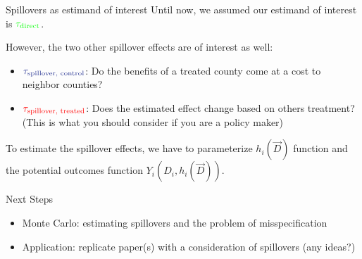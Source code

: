 \documentclass[aspectratio=43]{beamer}
\begin{document}
\begin{frame}{Spillovers as estimand of interest}
    Until now, we assumed our estimand of interest is $\textcolor{green}{\tau_{\text{direct}}}$.

    However, the two other spillover effects are of interest as well:
    \begin{itemize}
        \item $\textcolor{purple}{\tau_{\text{spillover, control}}}$: Do the benefits of a treated county come at a cost to neighbor counties? 
        
        \item $\textcolor{red}{\tau_{\text{spillover, treated}}}$: Does the estimated effect change based on others treatment? (This is what you should consider if you are a policy maker)
    \end{itemize}

    To estimate the spillover effects, we have to parameterize $h_i(\vec{D})$ function and the potential outcomes function $Y_i(D_i, h_i(\vec{D}))$.
\end{frame}



\begin{frame}{Next Steps}
    \begin{itemize}
        \item Monte Carlo: estimating spillovers and the problem of misspecification
        
        \item Application: replicate paper(s) with a consideration of spillovers (any ideas?)
    \end{itemize}
\end{frame}
\end{document}
